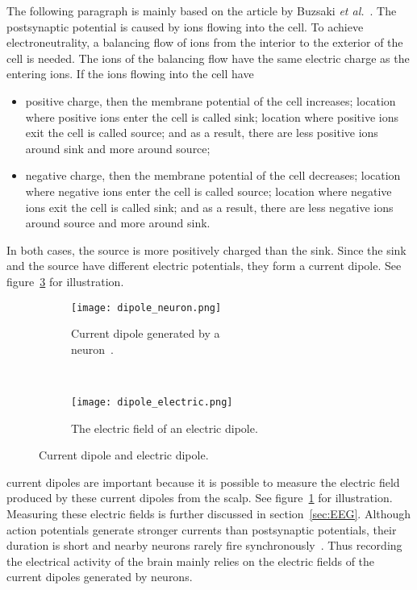 The following paragraph is mainly based on the article by Buzsaki \textit{et al.}~\cite{electric_field}. The \gls{postsynaptic potential} is caused by ions flowing into the cell. To achieve electroneutrality, a balancing flow of ions from the interior to the exterior of the cell is needed. The ions of the balancing flow have the same electric charge as the entering ions. If the ions flowing into the cell have
\begin{itemize}
	\item positive charge, then 
	\subitem the \gls{membrane potential} of the cell increases;
	\subitem location where positive ions enter the cell is called \gls{sink};
	\subitem location where positive ions exit the cell is called \gls{source}; and
	\subitem as a result, there are less positive ions around \gls{sink} and more around \gls{source};
	\item negative charge, then
	\subitem the \gls{membrane potential} of the cell decreases;
	\subitem location where negative ions enter the cell is called \gls{source};
	\subitem location where negative ions exit the cell is called \gls{sink}; and
	\subitem as a result, there are less negative ions around \gls{source} and more around \gls{sink}.
\end{itemize}

In both cases, the \gls{source} is more positively charged than the \gls{sink}. Since the \gls{sink} and the \gls{source} have different electric potentials, they form a \gls{current dipole}. See figure~\ref{fig:dipole} for illustration.

\begin{figure}[h!]
	\centering
	\begin{subfigure}{0.48\textwidth}
		\texttt{[image: dipole\_neuron.png]}
		\caption{Current dipole generated by a \\neuron~\cite[p.~669]{neuroscience}.}
		\label{fig:dipole_neuron}
	\end{subfigure}
	~
	\begin{subfigure}{0.48\textwidth}
		\texttt{[image: dipole\_electric.png]}
		\caption{The electric field of an electric dipole\protect\footnotemark.}
		\label{fig:dipole_electric}
	\end{subfigure}
	\caption{Current dipole and electric dipole.}
	\label{fig:dipole}
\end{figure}

\Glspl{current dipole} are important because it is possible to measure the electric field produced by these \glspl{current dipole} from the scalp. See figure~\ref{fig:dipole_neuron} for illustration. Measuring these electric fields is further discussed in section~\ref{sec:EEG}. Although \glspl{action potential} generate stronger currents than \glspl{postsynaptic potential}, their duration is short and nearby \glspl{neuron} rarely fire synchronously~\cite{electric_field}. Thus recording the electrical activity of the brain mainly relies on the electric fields of the \glspl{current dipole} generated by \glspl{neuron}.

